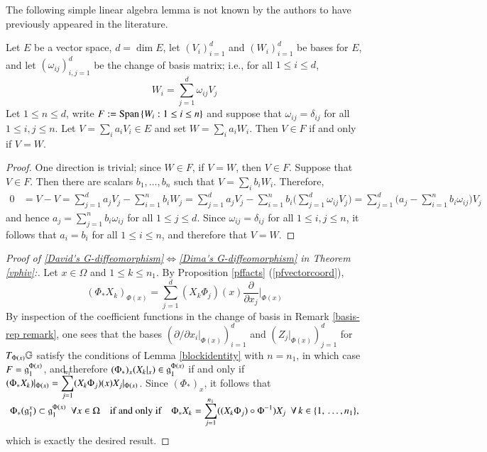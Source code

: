 \documentclass[leqno]{amsart}
\begin{document}
	The following simple linear algebra lemma is not known by the authors to have previously appeared in the literature.
	\begin{lemma}\label{blockidentity}
		Let $E$ be a vector space, $d=\dim E$, let $(V_i)_{i=1}^d$ and $(W_i)_{i=1}^d$ be bases for $E$, and let $(\omega_{ij})_{i,j=1}^d$ be the change of basis matrix; i.e., for all $1\leq i\leq d$,
		$$W_i=\sum_{j=1}^d \omega_{ij}V_j$$
		Let $1\leq n\leq d$, write $F:=\Span\{W_i:1\leq i\leq n\}$ and suppose that $\omega_{ij}=\delta_{ij}$ for all $1\leq i,j\leq n$. Let $\displaystyle V=\sum_i a_iV_i\in E$ and set $\displaystyle W=\sum_i a_iW_i$. Then $V\in F$ if and only if $V=W$.
	\end{lemma}
	\begin{proof}
		One direction is trivial; since $W\in F$, if $V=W$, then $V\in F$. Suppose that $V\in F$. Then there are scalars $b_1,\hdots, b_n$ such that $\displaystyle V=\sum_i b_iW_i$. Therefore,
		\begin{align*}
			0&=V-V=\sum_{j=1}^d a_jV_j-\sum_{i=1}^n b_iW_j=\sum_{j=1}^d a_jV_j-\sum_{i=1}^n b_i\biggl(\sum_{j=1}^d \omega_{ij}V_j\biggr)=\sum_{j=1}^d \biggl(a_j-\sum_{i=1}^n  b_i\omega_{ij}\biggr)V_j
		\end{align*}
		and hence $\displaystyle{a_j=\sum_{j=1}^n  b_i\omega_{ij}}$ for all $1\leq j\leq d$. Since $\omega_{ij}=\delta_{ij}$ for all $1\leq i,j\leq n$, it follows that $a_i=b_i$ for all $1\leq i\leq n$, and therefore that $V=W$.
	\end{proof}
	
	
	\begin{proof}[Proof of \eqref{David's G-diffeomorphism}$\Longleftrightarrow$\eqref{Dima's G-diffeomorphism} in Theorem \ref{vphiv}:] 
		
		Let $x\in\Omega$ and $1\leq k\leq n_1$. By Proposition \ref{pffacts} (\ref{pfvectorcoord}),
		$$(\Phi_*X_k)_{\Phi(x)}=\sum_{j=1}^d (X_k\Phi_j)(x)\frac{\partial}{\partial x_j}\bigg|_{\Phi(x)}$$
		By inspection of the coefficient functions in the change of basis in Remark \ref{basis-rep remark}, one sees that the bases $(\partial/\partial x_i|_{\Phi(x)})_{i=1}^d$ and $(Z_j|_{\Phi(x)})_{j=1}^d$ for $T_{\Phi(x)}\GG$ satisfy the conditions of Lemma \ref{blockidentity} with $n=n_1$, in which case $F=\gra 1 {\Phi(x)}$, and therefore $(\Phi_*)_x(X_k|_x)\in \gra 1 {\Phi(x)}$ if and only if $\displaystyle(\Phi_*X_k)|_{\Phi(x)}=\smash{\sum_{j=1}^{n_1}} (X_k\Phi_j)(x)X_j|_{\Phi(x)}$. Since $(\Phi_*)_x$, it follows that
		$$\Phi_*(\gra 1 x)\subset \gra 1 {\Phi(x)}\,\,\,\forall x\in\Omega\quad\text{if and only if}\quad\Phi_*X_k=\sum_{j=1}^{n_1} ((X_k\Phi_j)\circ\Phi^{-1})X_j\,\,\,\forall\,k\in\{1,\,\dotsc, n_1\},$$
		which is exactly the desired result.
	\end{proof}
	
\end{document}
